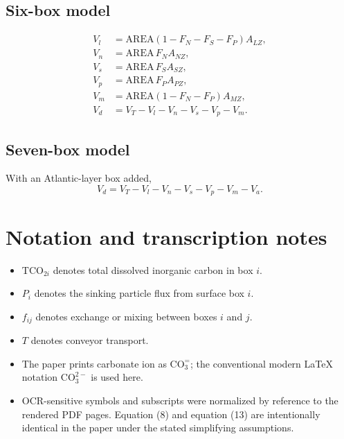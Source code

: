 \documentclass[11pt]{article}
\newcommand{\TCO}[1]{\mathrm{TCO}_{2#1}}
\newcommand{\COthree}[1]{\mathrm{CO}_{3#1}^{2-}}
\begin{document}
\subsection*{Six-box model}

\begin{align*}
V_l &= \mathrm{AREA}(1-F_N-F_S-F_P)A_{LZ},\\
V_n &= \mathrm{AREA}\,F_N A_{NZ},\\
V_s &= \mathrm{AREA}\,F_S A_{SZ},\\
V_p &= \mathrm{AREA}\,F_P A_{PZ},\\
V_m &= \mathrm{AREA}(1-F_N-F_P)A_{MZ},\\
V_d &= V_T-V_l-V_n-V_s-V_p-V_m.
\end{align*}

\subsection*{Seven-box model}

With an Atlantic-layer box added,
\begin{equation*}
V_d=V_T-V_l-V_n-V_s-V_p-V_m-V_a.
\end{equation*}

\section*{Notation and transcription notes}

\begin{itemize}
  \item $\TCO{i}$ denotes total dissolved inorganic carbon in box $i$.
  \item $P_i$ denotes the sinking particle flux from surface box $i$.
  \item $f_{ij}$ denotes exchange or mixing between boxes $i$ and $j$.
  \item $T$ denotes conveyor transport.
  \item The paper prints carbonate ion as $\mathrm{CO}_3^{=}$; the conventional modern LaTeX notation $\COthree{}$ is used here.
  \item OCR-sensitive symbols and subscripts were normalized by reference to the rendered PDF pages. Equation (8) and equation (13) are intentionally identical in the paper under the stated simplifying assumptions.
\end{itemize}

\newpage

%
%
%
%
\end{document}
